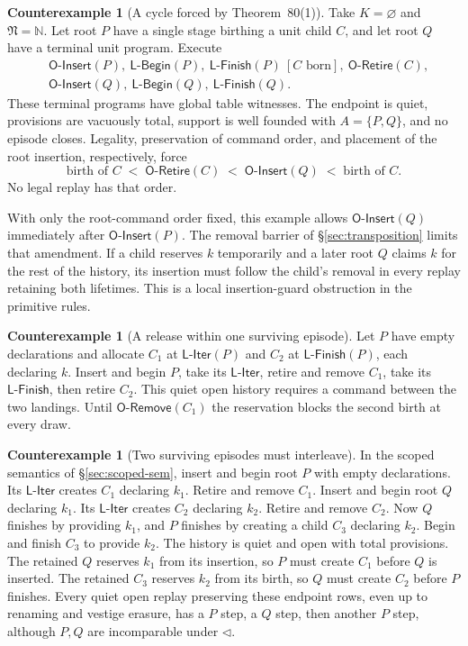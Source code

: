\documentclass[11pt,a4paper]{article}
\theoremstyle{definition}
\newtheorem{counterexample}[definition]{Counterexample}
\theoremstyle{plain}
\newcommand{\N}{\mathfrak{N}}
\newcommand{\OInsert}{\mathsf{O\text{-}Insert}}
\newcommand{\ORetire}{\mathsf{O\text{-}Retire}}
\newcommand{\ORemove}{\mathsf{O\text{-}Remove}}
\newcommand{\LBegin}{\mathsf{L\text{-}Begin}}
\newcommand{\LIter}{\mathsf{L\text{-}Iter}}
\newcommand{\LFinish}{\mathsf{L\text{-}Finish}}
\begin{document}
\begin{counterexample}[A cycle forced by Theorem~80(1)]
Take $K=\varnothing$ and $\N=\mathbb N$. Let root $P$ have a single stage birthing a unit child $C$, and let root $Q$ have a terminal unit program. Execute
\[
\begin{aligned}
 &\OInsert(P),\ \LBegin(P),\ \LFinish(P)\ [C\text{ born}],\ \ORetire(C),\\
 &\OInsert(Q),\ \LBegin(Q),\ \LFinish(Q).
\end{aligned}
\]
These terminal programs have global table witnesses. The endpoint is quiet, provisions are vacuously total, support is well founded with $A=\{P,Q\}$, and no episode closes. Legality, preservation of command order, and placement of the root insertion, respectively, force
\[
   \text{birth of }C\;<\;\ORetire(C)\;<\;\OInsert(Q)\;<\;\text{birth of }C .
\]
No legal replay has that order.
\end{counterexample}

With only the root-command order fixed, this example allows $\OInsert(Q)$ immediately after $\OInsert(P)$. The removal barrier of \S\ref{sec:transposition} limits that amendment. If a child reserves $k$ temporarily and a later root $Q$ claims $k$ for the rest of the history, its insertion must follow the child's removal in every replay retaining both lifetimes. This is a local insertion-guard obstruction in the primitive rules.

\begin{counterexample}[A release within one surviving episode]
Let $P$ have empty declarations and allocate $C_1$ at $\LIter(P)$ and $C_2$ at $\LFinish(P)$, each declaring $k$. Insert and begin $P$, take its $\LIter$, retire and remove $C_1$, take its $\LFinish$, then retire $C_2$. This quiet open history requires a command between the two landings. Until $\ORemove(C_1)$ the reservation blocks the second birth at every draw.
\end{counterexample}

\begin{counterexample}[Two surviving episodes must interleave]
In the scoped semantics of \S\ref{sec:scoped-sem}, insert and begin root $P$ with empty declarations. Its $\LIter$ creates $C_1$ declaring $k_1$. Retire and remove $C_1$.
Insert and begin root $Q$ declaring $k_1$. Its $\LIter$ creates $C_2$ declaring $k_2$. Retire and remove $C_2$. Now $Q$ finishes by providing $k_1$, and $P$ finishes by creating a child $C_3$ declaring $k_2$. Begin and finish $C_3$ to provide $k_2$.
The history is quiet and open with total provisions. The retained $Q$ reserves $k_1$ from its insertion, so $P$ must create $C_1$ before $Q$ is inserted. The retained $C_3$ reserves $k_2$ from its birth, so $Q$ must create $C_2$ before $P$ finishes. Every quiet open replay preserving these endpoint rows, even up to renaming and vestige erasure, has a $P$ step, a $Q$ step, then another $P$ step, although $P,Q$ are incomparable under $\triangleleft$.
\end{counterexample}
\end{document}
